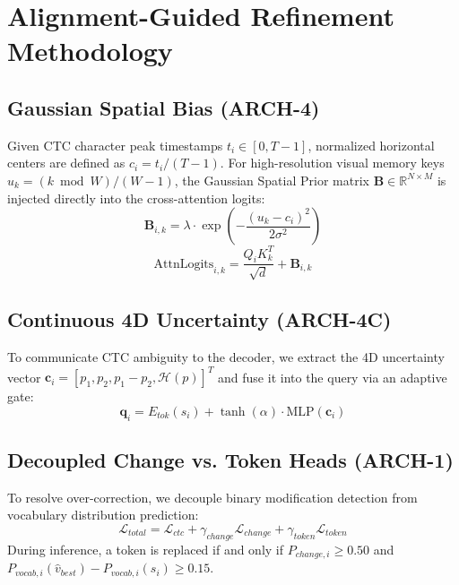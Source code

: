 \section{Alignment-Guided Refinement Methodology}
\label{sec:method}

\subsection{Gaussian Spatial Bias (ARCH-4)}
Given CTC character peak timestamps $t_i \in [0, T-1]$, normalized horizontal centers are defined as $c_i = t_i / (T - 1)$. For high-resolution visual memory keys $u_k = (k \bmod W) / (W - 1)$, the Gaussian Spatial Prior matrix $\mathbf{B} \in \mathbb{R}^{N \times M}$ is injected directly into the cross-attention logits:
\begin{equation}
\mathbf{B}_{i, k} = \lambda \cdot \exp\left(-\frac{(u_k - c_i)^2}{2\sigma^2}\right)
\end{equation}
\begin{equation}
\text{AttnLogits}_{i, k} = \frac{Q_i K_k^T}{\sqrt{d}} + \mathbf{B}_{i, k}
\end{equation}

\subsection{Continuous 4D Uncertainty (ARCH-4C)}
To communicate CTC ambiguity to the decoder, we extract the 4D uncertainty vector $\mathbf{c}_i = [p_1, p_2, p_1-p_2, \mathcal{H}(p)]^T$ and fuse it into the query via an adaptive gate:
\begin{equation}
\mathbf{q}_i = E_{tok}(s_i) + \tanh(\alpha) \cdot \text{MLP}(\mathbf{c}_i)
\end{equation}

\subsection{Decoupled Change vs. Token Heads (ARCH-1)}
To resolve over-correction, we decouple binary modification detection from vocabulary distribution prediction:
\begin{equation}
\mathcal{L}_{total} = \mathcal{L}_{ctc} + \gamma_{change} \mathcal{L}_{change} + \gamma_{token} \mathcal{L}_{token}
\end{equation}
During inference, a token is replaced if and only if $P_{change, i} \ge 0.50$ and $P_{vocab, i}(\hat{v}_{best}) - P_{vocab, i}(s_i) \ge 0.15$.
